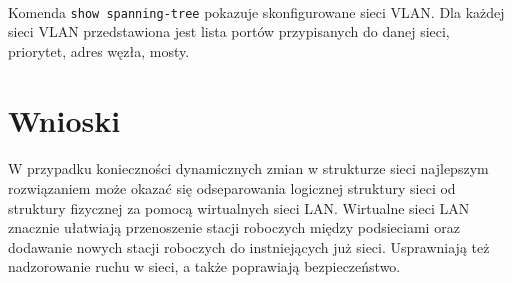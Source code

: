 \documentclass[wide,a4paper,titlepage,12pt] {article}
\begin{document}
  \paragraph{}
  Komenda \texttt{show spanning-tree} pokazuje skonfigurowane sieci VLAN. 
  Dla każdej sieci VLAN przedstawiona jest lista portów przypisanych do danej sieci, priorytet, adres węzła, mosty.


  \section{Wnioski}
  \paragraph{}
  W przypadku konieczności dynamicznych zmian w strukturze sieci najlepszym rozwiązaniem może okazać się odseparowania logicznej struktury sieci od struktury fizycznej za pomocą wirtualnych sieci LAN.
  Wirtualne sieci LAN znacznie ułatwiają przenoszenie stacji roboczych między podsieciami oraz dodawanie nowych stacji roboczych do instniejących już sieci. Usprawniają też nadzorowanie ruchu w sieci, a także poprawiają bezpieczeństwo.
\end{document}
